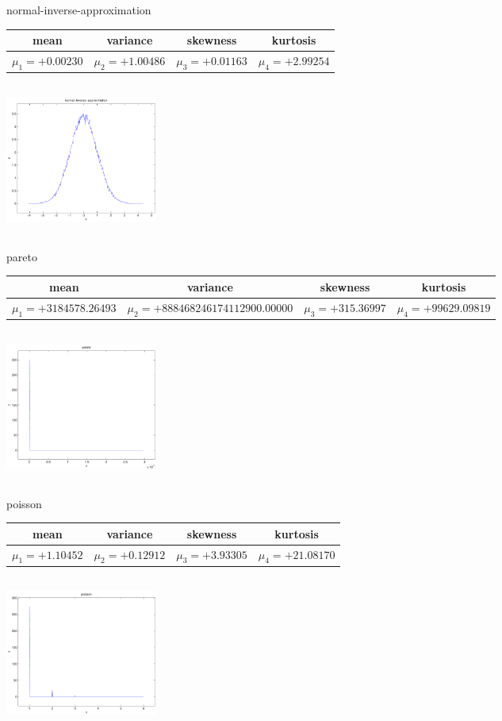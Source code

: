 \documentclass[9pt]{article}
\theoremstyle{plain}
\theoremstyle{definition}
\theoremstyle{remark}
\numberwithin{equation}{section}
\begin{document}
\newpage
normal-inverse-approximation \begin{tabular}{|c|c|c|c|}  mean & variance & skewness & kurtosis \\  \hline
$\mu_1 = +0.00230$ & $\mu_2 = +1.00486$ & $\mu_3 = +0.01163$ & $\mu_4 =+2.99254$ \\
\end{tabular}

\includegraphics[width=5cm,height=5cm]{normal-inverse-approximation.pdf}

pareto \begin{tabular}{|c|c|c|c|}  mean & variance & skewness & kurtosis \\  \hline
$\mu_1 = +3184578.26493$ & $\mu_2 = +888468246174112900.00000$ & $\mu_3 = +315.36997$ & $\mu_4 =+99629.09819$ \\
\end{tabular}

\includegraphics[width=5cm,height=5cm]{pareto.pdf}

poisson \begin{tabular}{|c|c|c|c|}  mean & variance & skewness & kurtosis \\  \hline
$\mu_1 = +1.10452$ & $\mu_2 = +0.12912$ & $\mu_3 = +3.93305$ & $\mu_4 =+21.08170$ \\
\end{tabular}

\includegraphics[width=5cm,height=5cm]{poisson.pdf}
\end{document}
